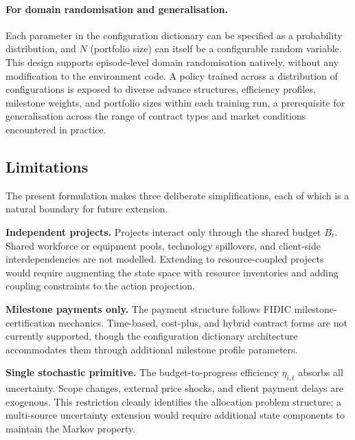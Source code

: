 \paragraph{For domain randomisation and generalisation.}
Each parameter in the configuration dictionary can be specified as a
probability distribution, and $N$ (portfolio size) can itself be a
configurable random variable. This design supports episode-level
domain randomisation \citep{Tobin2017} natively, without any
modification to the environment code. A policy trained across a
distribution of configurations is exposed to diverse advance
structures, efficiency profiles, milestone weights, and portfolio
sizes within each training run, a prerequisite for generalisation
across the range of contract types and market conditions encountered
in practice.

\subsection{Limitations}
\label{subsec:limitations}

The present formulation makes three deliberate simplifications, each
of which is a natural boundary for future extension.

\textbf{Independent projects.} Projects interact only through the
shared budget $B_t$. Shared workforce or equipment pools, technology
spillovers, and client-side interdependencies are not modelled.
Extending to resource-coupled projects would require augmenting the
state space with resource inventories and adding coupling constraints
to the action projection.

\textbf{Milestone payments only.} The payment structure follows FIDIC
milestone-certification mechanics. Time-based, cost-plus, and hybrid
contract forms are not currently supported, though the configuration
dictionary architecture accommodates them through additional milestone
profile parameters.

\textbf{Single stochastic primitive.} The budget-to-progress
efficiency $\eta_{i,t}$ absorbs all uncertainty. Scope changes,
external price shocks, and client payment delays are exogenous. This
restriction cleanly identifies the allocation problem structure; a
multi-source uncertainty extension would require additional state
components to maintain the Markov property.

